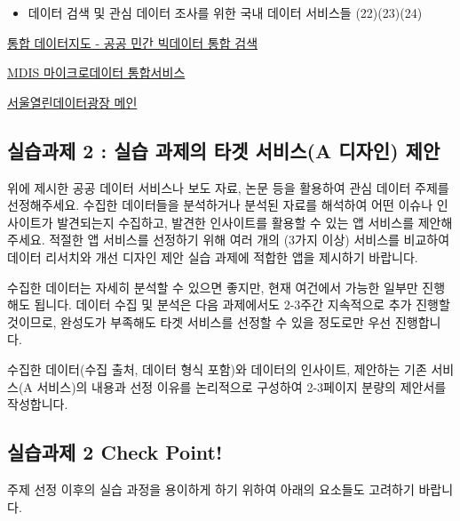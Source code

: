 \documentclass[
  letterpaper,
]{book}
\providecommand{\tightlist}{%
  \setlength{\itemsep}{0pt}\setlength{\parskip}{0pt}}\usepackage{longtable,booktabs,array}
\begin{document}
\begin{itemize}
\tightlist
\item
  데이터 검색 및 관심 데이터 조사를 위한 국내 데이터 서비스들
  (22)(23)(24)
\end{itemize}

\href{https://www.bigdata-map.kr}{통합 데이터지도 - 공공 민간 빅데이터
통합 검색}

\href{https://mdis.kostat.go.kr/index.do}{MDIS 마이크로데이터
통합서비스}

\href{https://data.seoul.go.kr}{서울열린데이터광장 메인}

\subsection{실습과제 2 : 실습 과제의 타겟 서비스(A 디자인)
제안}\label{uxc2e4uxc2b5uxacfcuxc81c-2-uxc2e4uxc2b5-uxacfcuxc81cuxc758-uxd0c0uxac9f-uxc11cuxbe44uxc2a4a-uxb514uxc790uxc778-uxc81cuxc548}

위에 제시한 공공 데이터 서비스나 보도 자료, 논문 등을 활용하여 관심
데이터 주제를 선정해주세요. 수집한 데이터들을 분석하거나 분석된 자료를
해석하여 어떤 이슈나 인사이트가 발견되는지 수집하고, 발견한 인사이트를
활용할 수 있는 앱 서비스를 제안해주세요. 적절한 앱 서비스를 선정하기
위해 여러 개의 (3가지 이상) 서비스를 비교하여 데이터 리서치와 개선
디자인 제안 실습 과제에 적합한 앱을 제시하기 바랍니다.

수집한 데이터는 자세히 분석할 수 있으면 좋지만, 현재 여건에서 가능한
일부만 진행해도 됩니다. 데이터 수집 및 분석은 다음 과제에서도 2-3주간
지속적으로 추가 진행할 것이므로, 완성도가 부족해도 타겟 서비스를 선정할
수 있을 정도로만 우선 진행합니다.

수집한 데이터(수집 출처, 데이터 형식 포함)와 데이터의 인사이트, 제안하는
기존 서비스(A 서비스)의 내용과 선정 이유를 논리적으로 구성하여 2-3페이지
분량의 제안서를 작성합니다.

\subsection{실습과제 2 Check
Point!}\label{uxc2e4uxc2b5uxacfcuxc81c-2-check-point}

주제 선정 이후의 실습 과정을 용이하게 하기 위하여 아래의 요소들도
고려하기 바랍니다.
\end{document}
